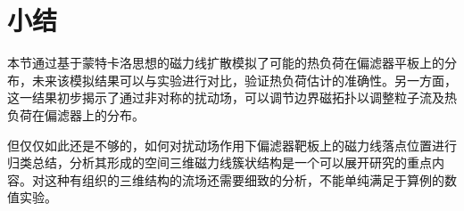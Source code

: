 


\section{小结}

本节通过基于蒙特卡洛思想的磁力线扩散模拟了可能的热负荷在偏滤器平板上的分布，未来该模拟结果可以与实验进行对比，验证热负荷估计的准确性。另一方面，这一结果初步揭示了通过非对称的扰动场，可以调节边界磁拓扑以调整粒子流及热负荷在偏滤器上的分布。

但仅仅如此还是不够的，如何对扰动场作用下偏滤器靶板上的磁力线落点位置进行归类总结，分析其形成的空间三维磁力线簇状结构是一个可以展开研究的重点内容。对这种有组织的三维结构的流场还需要细致的分析，不能单纯满足于算例的数值实验。